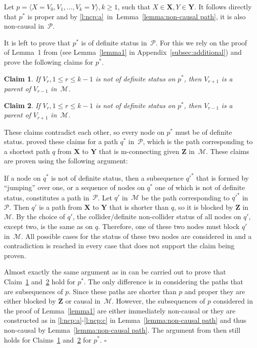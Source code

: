\documentclass[11pt,a4paper]{article}
\newtheorem{claim}{Claim}
\newenvironment{proofof}[1][]{\begin{trivlist}
   \item[\hskip \labelsep {\bfseries Proof of #1.}]}{\hfill{}$\square$\end{trivlist}}
\newcommand{\g}[1][G]{\mathcal{#1}}
\newcommand{\pstar}[1][p]{{#1}^{*}}
\begin{document}
\begin{proofof}[Lemma~\ref{lemma:1}]
Let $p = \langle X = V_{0}, V_{1},\dots ,V_{k} = Y \rangle, k \ge 1$, such that $X \in \mathbf{X}, Y \in \mathbf{Y}$. It follows directly that $\pstar$ is proper and by \ref{l:ncp:a}~in~Lemma~\ref{lemma:non-causal path}, it is also non-causal in~$\g[P]$.

It is left to prove that $\pstar$ is of definite status in~$\g[P]$. For this we rely on the proof of Lemma~1 from \cite{zhang2006causal} (see Lemma~\ref{lemma1} in Appendix~\ref{subsec:additional}) and prove the following claims for $\pstar$.

\begin{claim}
If $V_r, 1 \le r \le k-1$ is not of definite status on $\pstar$, then $V_{r+1}$ is a parent of $V_{r-1}$ in~$\g[M]$.
\label{claim zhang 1}
\end{claim}

\begin{claim}
If $V_r, 1 \le r \le k-1$ is not of definite status on $\pstar$, then $V_{r-1}$ is a parent of $V_{r+1}$ in~$\g[M]$.
 \label{claim zhang 2}
\end{claim}

\noindent{}These claims contradict each other, so every node on $\pstar$ must be of definite status.
\cite{zhang2006causal} proved these claims for a path $\pstar[q]$ in~$\g[P]$, which is the path corresponding to a shortest path $q$ from $\mathbf{X}$ to $\mathbf{Y}$ that is m-connecting given $\mathbf{Z}$ in~$\g[M]$.
These claims are proven using the following argument:

If a node on $\pstar[q]$ is not of definite status, then a subsequence $\pstar[q']$ that is formed by ``jumping'' over one, or a sequence of nodes on $\pstar[q]$ one of which is not of definite status, constitutes a path in~$\g[P]$.
Let $q'$ in~$\g[M]$ be the path corresponding to $\pstar[q']$ in~$\g[P]$. Then $q'$ is a path from $\mathbf{X}$ to $\mathbf{Y}$ that is shorter than $q$, so it is blocked by $\mathbf{Z}$ in~$\g[M]$. By the choice of $q'$, the collider/definite non-collider status of all nodes on $q'$, except two, is the same as on $q$. Therefore, one of these two nodes must block $q'$ in~$\g[M]$. All possible cases for the status of these two nodes are considered in \cite{zhang2006causal} and a contradiction is reached in every case that does not support the claim being proven.

Almost exactly the same argument as in \cite{zhang2006causal} can be carried out to prove that Claim~\ref{claim zhang 1} and~\ref{claim zhang 2} hold for $\pstar$. The only difference is in considering the paths that are subsequences of $p$. Since these paths are shorter than $p$ and proper they are either blocked by $\mathbf{Z}$ or causal in~$\g[M]$. However, the subsequences of $p$ considered in the proof of Lemma~\ref{lemma1} are either immediately non-causal or they are constructed as in \ref{l:ncp:a}-\ref{l:ncp:c} in Lemma~\ref{lemma:non-causal path} and thus non-causal by Lemma~\ref{lemma:non-causal path}. The argument from \cite{zhang2006causal} then still holds for Claims~\ref{claim zhang 1} and~\ref{claim zhang 2} for $\pstar$.
\end{proofof}
\end{document}
